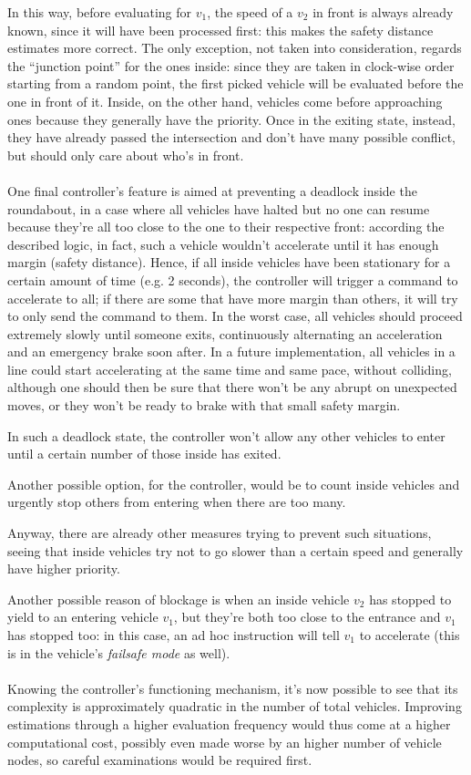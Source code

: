 In this way, before evaluating for $v_1$, the speed of a $v_2$ in front is
always already known, since it will have been processed first: this makes the
safety distance estimates more correct. The only exception, not taken into
consideration, regards the ``junction point'' for the ones inside: since they
are taken in clock-wise order starting from a random point, the first picked
vehicle will be evaluated before the one in front of it. Inside, on the other
hand, vehicles come before approaching ones because they generally have the
priority. Once in the exiting state, instead, they have already passed the
intersection and don't have many possible conflict, but should only care about
who's in front.
\\
\\
One final controller's feature is aimed at preventing a deadlock inside the
roundabout, in a case where all vehicles have halted but no one can resume
because they're all too close to the one to their respective front: according
the described logic, in fact, such a vehicle wouldn't accelerate until it has
enough margin (safety distance). Hence, if all inside vehicles have been
stationary for a certain amount of time (e.g. 2 seconds), the controller will
trigger a command to accelerate to all; if there are some that have more margin
than others, it will try to only send the command to them. In the worst case,
all vehicles should proceed extremely slowly until someone exits, continuously
alternating an acceleration and an emergency brake soon after. In a future
implementation, all vehicles in a line could start accelerating at the same time
and same pace, without colliding, although one should then be sure that there
won't be any abrupt on unexpected moves, or they won't be ready to brake with
that small safety margin.

In such a deadlock state, the controller won't allow any other vehicles to enter
until a certain number of those inside has exited.

Another possible option, for the controller, would be to count inside vehicles
and urgently stop others from entering when there are too many.

Anyway, there are already other measures trying to prevent such situations,
seeing that inside vehicles try not to go slower than a certain speed and
generally have higher priority.

Another possible reason of blockage is when an inside vehicle $v_2$ has stopped
to yield to an entering vehicle $v_1$, but they're both too close to the
entrance and $v_1$ has stopped too: in this case, an ad hoc instruction will
tell $v_1$ to accelerate (this is in the vehicle's \textit{failsafe mode} as
well).
\\
\\
Knowing the controller's functioning mechanism, it's now possible to see that
its complexity is approximately quadratic in the number of total vehicles.
Improving estimations through a higher evaluation frequency would thus come at a
higher computational cost, possibly even made worse by an higher number of
vehicle nodes, so careful examinations would be required first.

